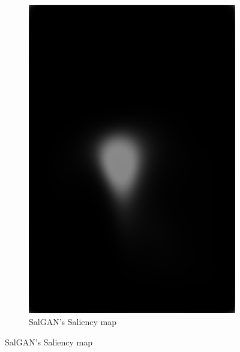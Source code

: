 \documentclass[11pt]{article}
\begin{document}
\begin{figure}[h]
\begin{subfigure}[b]{0.25\textwidth}
         \includegraphics[width=\textwidth]{animal-centre.jpg}
         \caption{SalGAN's Saliency map}
         \label{fig:salien}
     \end{subfigure}
\end{figure}
\end{document}

